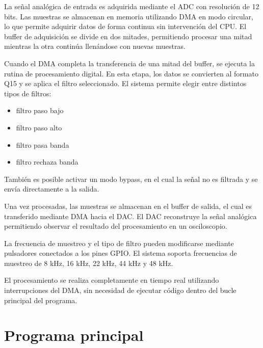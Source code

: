 \documentclass[12pt]{article}
\begin{document}
	La señal analógica de entrada es adquirida mediante el ADC con resolución de 12 bits. Las muestras se almacenan en memoria utilizando DMA en modo circular, lo que permite adquirir datos de forma continua sin intervención del CPU. El buffer de adquisición se divide en dos mitades, permitiendo procesar una mitad mientras la otra continúa llenándose con nuevas muestras.

	Cuando el DMA completa la transferencia de una mitad del buffer, se ejecuta la rutina de procesamiento digital. En esta etapa, los datos se convierten al formato Q15 y se aplica el filtro seleccionado. El sistema permite elegir entre distintos tipos de filtros:

	\begin{itemize}
	\item filtro paso bajo
	\item filtro paso alto
	\item filtro pasa banda
	\item filtro rechaza banda
	\end{itemize}

	También es posible activar un modo bypass, en el cual la señal no es filtrada y se envía directamente a la salida.

	Una vez procesadas, las muestras se almacenan en el buffer de salida, el cual es transferido mediante DMA hacia el DAC. El DAC reconstruye la señal analógica permitiendo observar el resultado del procesamiento en un osciloscopio.

	La frecuencia de muestreo y el tipo de filtro pueden modificarse mediante pulsadores conectados a los pines GPIO. El sistema soporta frecuencias de muestreo de 8 kHz, 16 kHz, 22 kHz, 44 kHz y 48 kHz.

	El procesamiento se realiza completamente en tiempo real utilizando interrupciones del DMA, sin necesidad de ejecutar código dentro del bucle principal del programa.

	\section{Programa principal}
\end{document}
